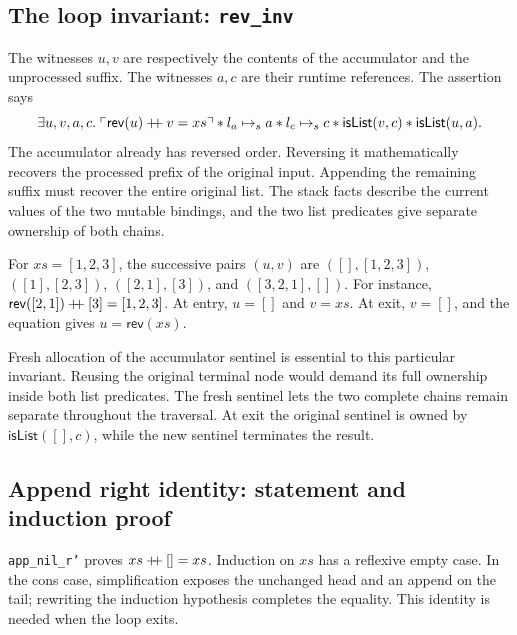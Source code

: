 \documentclass[11pt]{article}
\newcommand{\ptss}{\mathrel{\mapsto_{s}}}
\newcommand{\sep}{\mathbin{*}}
\newcommand{\pure}[1]{\ulcorner #1 \urcorner}
\begin{document}
\subsection{The loop invariant: \texttt{rev\_inv}}

\begin{minipage}{\linewidth}

\end{minipage}

The witnesses \(u,v\) are respectively the contents of the accumulator and
the unprocessed suffix. The witnesses \(a,c\) are their runtime references.
The assertion says
\[
\exists u,v,a,c.\;
 \pure{\mathsf{rev}(u)\mathbin{+\mkern-6mu+}v=xs}
 \sep l_a\ptss a \sep l_c\ptss c
 \sep\mathsf{isList}(v,c)\sep\mathsf{isList}(u,a).
\]
The accumulator already has reversed order. Reversing it mathematically
recovers the processed prefix of the original input. Appending the remaining
suffix must recover the entire original list. The stack facts describe the
current values of the two mutable bindings, and the two list predicates give
separate ownership of both chains.

For \(xs=[1,2,3]\), the successive pairs \((u,v)\) are
\(([],[1,2,3])\), \(([1],[2,3])\), \(([2,1],[3])\), and
\(([3,2,1],[])\). For instance,
\(\mathsf{rev}([2,1])\mathbin{+\mkern-6mu+}[3]=[1,2,3]\).
At entry, \(u=[]\) and \(v=xs\). At exit, \(v=[]\), and the equation gives
\(u=\mathsf{rev}(xs)\).

Fresh allocation of the accumulator sentinel is essential to this particular
invariant. Reusing the original terminal node would demand its full ownership
inside both list predicates. The fresh sentinel lets the two complete chains
remain separate throughout the traversal. At exit the original sentinel is
owned by \(\mathsf{isList}([],c)\), while the new sentinel terminates the result.

\subsection{Append right identity: statement and induction proof}

\begin{minipage}{\linewidth}

\end{minipage}

\texttt{app\_nil\_r'} proves \(xs\mathbin{+\mkern-6mu+}[]=xs\).
Induction on \(xs\) has a reflexive empty case. In the cons case, simplification
exposes the unchanged head and an append on the tail; rewriting the induction
hypothesis completes the equality. This identity is needed when the loop exits.
\end{document}
